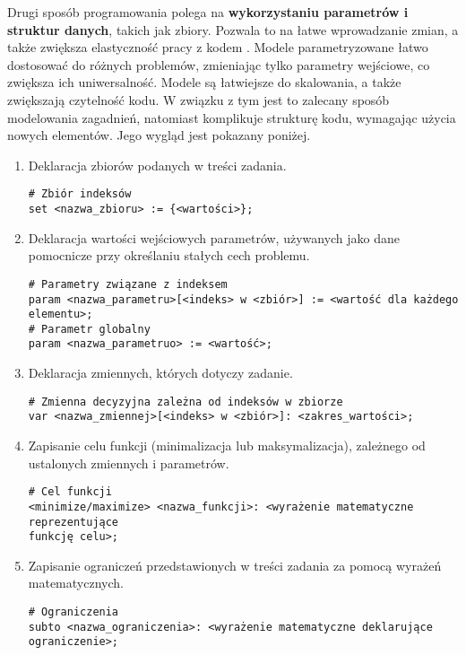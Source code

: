 Drugi sposób programowania polega na \textbf{wykorzystaniu parametrów i struktur danych}, takich jak zbiory. Pozwala to na łatwe wprowadzanie zmian, a także zwiększa elastyczność pracy z kodem  . Modele parametryzowane łatwo dostosować do różnych problemów, zmieniając tylko parametry wejściowe, co zwiększa ich uniwersalność. Modele są łatwiejsze do skalowania, a także zwiększają czytelność kodu. W związku z tym jest to zalecany sposób modelowania zagadnień, natomiast komplikuje strukturę kodu, wymagając użycia nowych elementów. %
Jego wygląd jest pokazany poniżej.

\begin{enumerate}
\item Deklaracja zbiorów podanych w treści zadania.

\begin{lstlisting}[language=zimpl]
# Zbiór indeksów
set <nazwa_zbioru> := {<wartości>};
\end{lstlisting}

\item Deklaracja wartości wejściowych parametrów, używanych jako dane pomocnicze przy określaniu stałych cech problemu.

\begin{lstlisting}[language=zimpl]
# Parametry związane z indeksem
param <nazwa_parametru>[<indeks> w <zbiór>] := <wartość dla każdego elementu>;
# Parametr globalny
param <nazwa_parametruo> := <wartość>;
\end{lstlisting}

\item Deklaracja zmiennych, których dotyczy zadanie.

\begin{lstlisting}[language=zimpl]
# Zmienna decyzyjna zależna od indeksów w zbiorze
var <nazwa_zmiennej>[<indeks> w <zbiór>]: <zakres_wartości>;
\end{lstlisting}

\item Zapisanie celu funkcji (minimalizacja lub maksymalizacja), zależnego od ustalonych zmiennych i parametrów.

\begin{lstlisting}[language=zimpl]
# Cel funkcji
<minimize/maximize> <nazwa_funkcji>: <wyrażenie matematyczne reprezentujące
funkcję celu>;
\end{lstlisting}

\item Zapisanie ograniczeń przedstawionych w treści zadania za pomocą wyrażeń matematycznych.

\begin{lstlisting}[language=zimpl]
# Ograniczenia
subto <nazwa_ograniczenia>: <wyrażenie matematyczne deklarujące ograniczenie>;
\end{lstlisting}
\end{enumerate}

